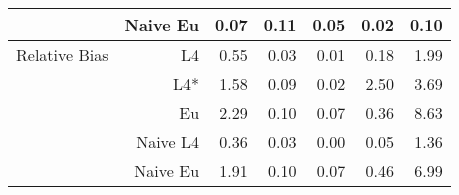 \documentclass[a4paper,12pt,twoside]{book}
\begin{document}
\begin{table}[H]
\begin{tabular}{crrrrrr}
&Naive Eu &   0.07 & 0.11 & 0.05 & 0.02 & 0.10 \\ 
  
   \hline
   
{\color{blue} Relative Bias } & L4  &0.55 & 0.03 & 0.01 & 0.18 & 1.99 \\ 
  
&L4*  &1.58 & 0.09 & 0.02 & 2.50 & 3.69 \\ 
  
 
  
&Eu &  
   2.29 & 0.10 & 0.07 & 0.36 & 8.63 \\ 
  
&Naive L4&  
  
   0.36 & 0.03 & 0.00 & 0.05 & 1.36 \\ 
  
  
&Naive Eu &  
  1.91 & 0.10 & 0.07 & 0.46 & 6.99 \\ 
  
  
  
\end{tabular}

\end{table}
\end{document}
